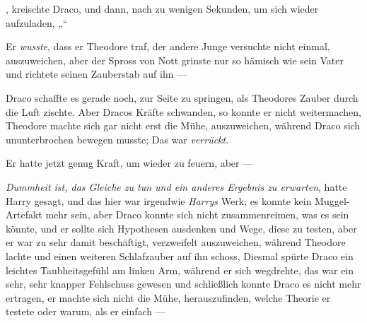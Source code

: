 \later

, kreischte Draco, und dann, nach zu wenigen Sekunden, um sich wieder aufzuladen,
„“

Er \emph{wusste}, dass er Theodore traf, der andere Junge versuchte nicht einmal, auszuweichen, aber der Spross von Nott grinste nur so hämisch wie sein Vater und richtete seinen Zauberstab auf ihn —

Draco schaffte es gerade noch, zur Seite zu springen, als Theodores Zauber durch die Luft zischte. Aber Dracos Kräfte schwanden, so konnte er nicht weitermachen, Theodore machte sich gar nicht erst die Mühe, auszuweichen, während Draco sich ununterbrochen bewegen musste; Das war \emph{verrückt}.

Er hatte jetzt genug Kraft, um wieder zu feuern, aber —

\emph{Dummheit ist, das Gleiche zu tun und ein anderes Ergebnis zu erwarten}, hatte Harry gesagt, und das hier war irgendwie \emph{Harrys} Werk, es konnte kein Muggel-Artefakt mehr sein, aber Draco konnte sich nicht zusammenreimen, was es sein könnte, und er sollte sich Hypothesen ausdenken und Wege, diese zu testen, aber er war zu sehr damit beschäftigt, verzweifelt auszuweichen, während Theodore lachte und einen weiteren Schlafzauber auf ihn schoss, Diesmal spürte Draco ein leichtes Taubheitsgefühl am linken Arm, während er sich wegdrehte, das war ein sehr, sehr knapper Fehlschuss gewesen und schließlich konnte Draco es nicht mehr ertragen, er machte sich nicht die Mühe, herauszufinden, welche Theorie er testete oder warum, als er einfach —

